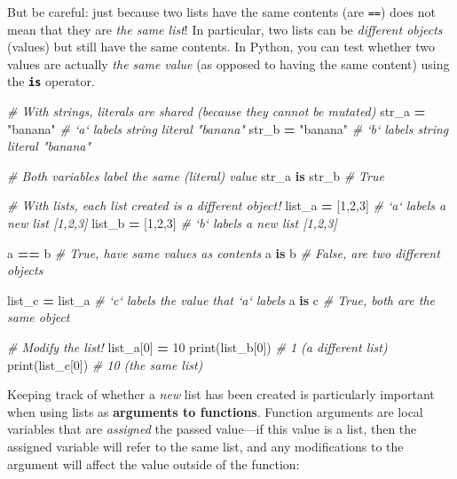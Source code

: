 \documentclass[]{book}
\newenvironment{Shaded}{\begin{snugshade}}{\end{snugshade}}
\newcommand{\KeywordTok}[1]{\textcolor[rgb]{0.13,0.29,0.53}{\textbf{#1}}}
\newcommand{\DecValTok}[1]{\textcolor[rgb]{0.00,0.00,0.81}{#1}}
\newcommand{\StringTok}[1]{\textcolor[rgb]{0.31,0.60,0.02}{#1}}
\newcommand{\CommentTok}[1]{\textcolor[rgb]{0.56,0.35,0.01}{\textit{#1}}}
\newcommand{\OperatorTok}[1]{\textcolor[rgb]{0.81,0.36,0.00}{\textbf{#1}}}
\newcommand{\BuiltInTok}[1]{#1}
\newcommand{\NormalTok}[1]{#1}
\begin{document}
But be careful: just because two lists have the same contents (are
\texttt{==}) does not mean that they are \emph{the same list}! In
particular, two lists can be \emph{different objects} (values) but still
have the same contents. In Python, you can test whether two values are
actually \emph{the same value} (as opposed to having the same content)
using the \textbf{\texttt{is}} operator.

\begin{Shaded}
\begin{Highlighting}[]
\CommentTok{# With strings, literals are shared (because they cannot be mutated)}
\NormalTok{str_a }\OperatorTok{=} \StringTok{"banana"}  \CommentTok{# `a` labels string literal "banana"}
\NormalTok{str_b }\OperatorTok{=} \StringTok{"banana"}  \CommentTok{# `b` labels string literal "banana"}

\CommentTok{# Both variables label the same (literal) value}
\NormalTok{str_a }\KeywordTok{is}\NormalTok{ str_b  }\CommentTok{# True}

\CommentTok{# With lists, each list created is a different object!}
\NormalTok{list_a }\OperatorTok{=}\NormalTok{ [}\DecValTok{1}\NormalTok{,}\DecValTok{2}\NormalTok{,}\DecValTok{3}\NormalTok{]  }\CommentTok{# `a` labels a new list [1,2,3]}
\NormalTok{list_b }\OperatorTok{=}\NormalTok{ [}\DecValTok{1}\NormalTok{,}\DecValTok{2}\NormalTok{,}\DecValTok{3}\NormalTok{]  }\CommentTok{# `b` labels a new list [1,2,3]}

\NormalTok{a }\OperatorTok{==}\NormalTok{ b  }\CommentTok{# True, have same values as contents}
\NormalTok{a }\KeywordTok{is}\NormalTok{ b  }\CommentTok{# False, are two different objects}

\NormalTok{list_c }\OperatorTok{=}\NormalTok{ list_a  }\CommentTok{# `c` labels the value that `a` labels}
\NormalTok{a }\KeywordTok{is}\NormalTok{ c  }\CommentTok{# True, both are the same object}

\CommentTok{# Modify the list!}
\NormalTok{list_a[}\DecValTok{0}\NormalTok{] }\OperatorTok{=} \DecValTok{10}
\BuiltInTok{print}\NormalTok{(list_b[}\DecValTok{0}\NormalTok{])  }\CommentTok{# 1 (a different list)}
\BuiltInTok{print}\NormalTok{(list_c[}\DecValTok{0}\NormalTok{])  }\CommentTok{# 10 (the same list)}
\end{Highlighting}
\end{Shaded}

Keeping track of whether a \emph{new} list has been created is
particularly important when using lists as \textbf{arguments to
functions}. Function arguments are local variables that are
\emph{assigned} the passed value---if this value is a list, then the
assigned variable will refer to the same list, and any modifications to
the argument will affect the value outside of the function:
\end{document}
